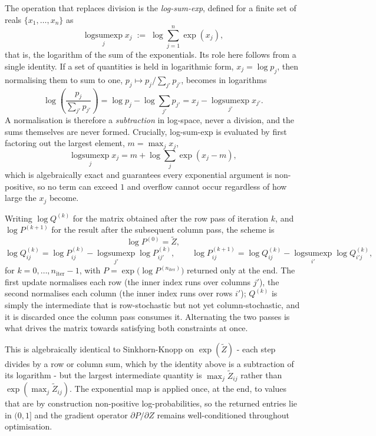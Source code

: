 \documentclass[11pt,a4paper]{article}
\begin{document}
	The operation that replaces division is the \emph{log-sum-exp}, defined for a finite set of reals
	$\{x_1,\dots,x_n\}$ as
	$$\operatorname*{logsumexp}_{j} x_j \;:=\; \log \sum_{j=1}^{n} \exp(x_j),$$
	that is, the logarithm of the sum of the exponentials. Its role here follows from a single identity. If a set of quantities is held in logarithmic form, $x_j = \log p_j$, then normalising them to sum to one, $p_j \mapsto p_j / \sum_{j'} p_{j'}$, becomes in logarithms
	$$\log\!\left(\frac{p_j}{\sum_{j'} p_{j'}}\right) = \log p_j - \log \sum_{j'} p_{j'} = x_j -
	\operatorname*{logsumexp}_{j'} x_{j'} .$$
	A normalisation is therefore a \emph{subtraction} in log-space, never a division, and the sums themselves are never formed. Crucially, log-sum-exp is evaluated by first factoring out the largest element, $m = \max_j x_j$,
	$$\operatorname*{logsumexp}_{j} x_j = m + \log \sum_{j} \exp(x_j - m),$$
	which is algebraically exact and guarantees every exponential argument is non-positive, so no term can exceed $1$ and overflow cannot occur regardless of how large the $x_j$ become.
	
	Writing $\log Q^{(k)}$ for the matrix obtained after the row pass of iteration $k$, and $\log P^{(k+1)}$ for the result after the subsequent column pass, the scheme is
	$$ \log P^{(0)} = \tilde{Z}, $$
	$$ \log Q^{(k)}_{ij} = \log P^{(k)}_{ij} - \operatorname*{logsumexp}_{j'} \log P^{(k)}_{ij'},
	\qquad
	\log P^{(k+1)}_{ij} = \log Q^{(k)}_{ij} - \operatorname*{logsumexp}_{i'} \log Q^{(k)}_{i'j}, $$
	for $k = 0,\dots,n_{\text{iter}}-1$, with $P = \exp\bigl(\log P^{(n_{\text{iter}})}\bigr)$ returned only at the end. The first update normalises each row (the inner index runs over columns $j'$), the second normalises each column (the inner index runs over rows $i'$); $Q^{(k)}$ is simply the intermediate that is row-stochastic but not yet column-stochastic, and it is discarded once the column pass consumes it. Alternating the two passes is what drives the matrix towards satisfying both constraints at once.
	
	This is algebraically identical to Sinkhorn-Knopp on $\exp(\tilde{Z})$ - each step divides by a row or column sum, which by the identity above is a subtraction of its logarithm - but the largest intermediate quantity is $\max_j \tilde{Z}_{ij}$ rather than $\exp(\max_j \tilde{Z}_{ij})$. The exponential map is applied once, at the end, to values that are by construction non-positive log-probabilities, so the returned entries lie in $(0,1]$ and the gradient operator $\partial P / \partial Z$ remains well-conditioned throughout optimisation.
\end{document}
